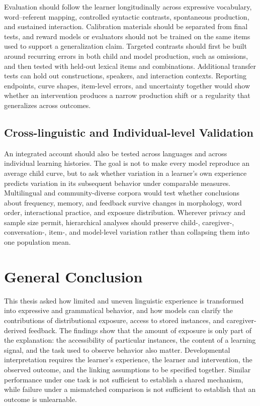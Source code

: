 Evaluation should follow the learner longitudinally across expressive vocabulary, word--referent mapping, controlled syntactic contrasts, spontaneous production, and sustained interaction. Calibration materials should be separated from final tests, and reward models or evaluators should not be trained on the same items used to support a generalization claim. Targeted contrasts should first be built around recurring errors in both child and model production, such as omissions, and then tested with held-out lexical items and combinations. Additional transfer tests can hold out constructions, speakers, and interaction contexts. Reporting endpoints, curve shapes, item-level errors, and uncertainty together would show whether an intervention produces a narrow production shift or a regularity that generalizes across outcomes.

\subsection{Cross-linguistic and Individual-level Validation}

An integrated account should also be tested across languages and across individual learning histories. The goal is not to make every model reproduce an average child curve, but to ask whether variation in a learner's own experience predicts variation in its subsequent behavior under comparable measures. Multilingual and community-diverse corpora would test whether conclusions about frequency, memory, and feedback survive changes in morphology, word order, interactional practice, and exposure distribution. Wherever privacy and sample size permit, hierarchical analyses should preserve child-, caregiver-, conversation-, item-, and model-level variation rather than collapsing them into one population mean.

\section{General Conclusion}
\label{sec:gd_conclusion}

This thesis asked how limited and uneven linguistic experience is transformed into expressive and grammatical behavior, and how models can clarify the contributions of distributional exposure, access to stored instances, and caregiver-derived feedback. The findings show that the amount of exposure is only part of the explanation: the accessibility of particular instances, the content of a learning signal, and the task used to observe behavior also matter. Developmental interpretation requires the learner's experience, the learner and intervention, the observed outcome, and the linking assumptions to be specified together. Similar performance under one task is not sufficient to establish a shared mechanism, while failure under a mismatched comparison is not sufficient to establish that an outcome is unlearnable.

